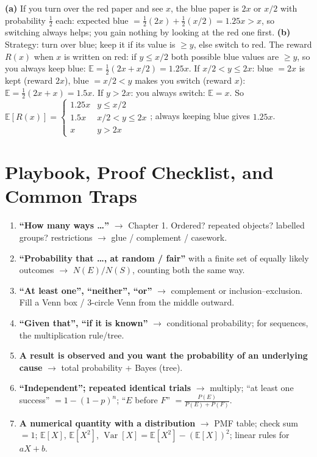 \documentclass[11pt]{article}
\newcommand{\E}{\mathbb{E}}
\newcommand{\Var}{\operatorname{Var}}
\begin{document}
\begin{exbox}
\textbf{(a)} If you turn over the red paper and see $x$, the blue paper is $2x$ or $x/2$ with probability $\tfrac12$ each: expected blue $=\tfrac12(2x)+\tfrac12(x/2)=1.25x>x$, so switching always helps; you gain nothing by looking at the red one first. \textbf{(b)} Strategy: turn over blue; keep it if its value is $\ge y$, else switch to red. The reward $R(x)$ when $x$ is written on red: if $y\le x/2$ both possible blue values are $\ge y$, so you always keep blue: $\E=\tfrac12(2x+x/2)=1.25x$. If $x/2<y\le2x$: blue $=2x$ is kept (reward $2x$), blue $=x/2<y$ makes you switch (reward $x$): $\E=\tfrac12(2x+x)=1.5x$. If $y>2x$: you always switch: $\E=x$. So $\E[R(x)]=\begin{cases}1.25x&y\le x/2\\1.5x&x/2<y\le2x\\x&y>2x\end{cases}$; always keeping blue gives $1.25x$.
\end{exbox}

\clearpage
\section{Playbook, Proof Checklist, and Common Traps}\label{sec:playbook}

\begin{methodbox}
\begin{enumerate}
\item \textbf{``How many ways \dots''} $\to$ Chapter 1. Ordered? repeated objects? labelled groups? restrictions $\to$ glue / complement / casework.
\item \textbf{``Probability that \dots, at random / fair''} with a finite set of equally likely outcomes $\to$ $N(E)/N(S)$, counting both the same way.
\item \textbf{``At least one'', ``neither'', ``or''} $\to$ complement or inclusion--exclusion. Fill a Venn box / 3-circle Venn from the middle outward.
\item \textbf{``Given that'', ``if it is known''} $\to$ conditional probability; for sequences, the multiplication rule/tree.
\item \textbf{A result is observed and you want the probability of an underlying cause} $\to$ total probability + Bayes (tree).
\item \textbf{``Independent''; repeated identical trials} $\to$ multiply; ``at least one success'' $=1-(1-p)^n$; ``$E$ before $F$'' $=\frac{P(E)}{P(E)+P(F)}$.
\item \textbf{A numerical quantity with a distribution} $\to$ PMF table; check sum $=1$; $\E[X]$, $\E[X^2]$, $\Var[X]=\E[X^2]-(\E[X])^2$; linear rules for $aX+b$.
\end{enumerate}
\end{methodbox}
\end{document}
